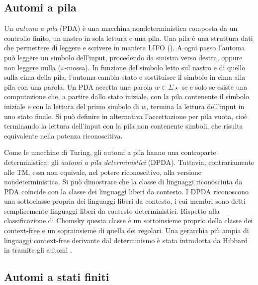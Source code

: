 \subsection{Automi a pila}\label{subs:prel:PDA}
Un \emph{automa a pila} (PDA) è una macchina nondeterministica composta da un controllo finito, un nastro in sola lettura e una pila. Una pila è una struttura dati che permettere di leggere e scrivere in maniera LIFO (). A ogni passo l'automa può leggere un simbolo dell'input, procedendo da sinistra verso destra, oppure non leggere nulla ($\varepsilon$-mossa). In funzione del simbolo letto sul nastro e di quello sulla cima della pila, l'automa cambia stato e sostituisce il simbolo in cima alla pila con una parola. Un PDA accetta una parola $w\in\Sigma\star$ se e solo se esiste una computazione che, a partire dallo stato iniziale, con la pila contenente il simbolo iniziale e con la lettura del primo simbolo di $w$, termina la lettura dell'input in uno stato finale. Si può definire in alternativa l'accettazione per pila vuota, cioè terminando la lettura dell'input con la pila non contenente simboli, che risulta equivalente nella potenza riconoscitiva.

Come le macchine di Turing, gli automi a pila hanno una controparte deterministica: gli \emph{automi a pila deterministici} (DPDA). Tuttavia, contrariamente alle TM, essa non equivale, nel potere riconoscitivo, alla versione nondeterministica. Si può dimostrare che la classe di linguaggi riconosciuta da PDA coincide con la classe dei linguaggi liberi da contesto. I DPDA riconoscono una sottoclasse propria dei linguaggi liberi da contesto, i cui membri sono detti semplicemente linguaggi liberi da contesto deterministici. Rispetto alla classificazione di Chomsky questa classe è un sottoinsieme proprio della classe dei context-free e un soprainsieme di quella dei regolari. Una gerarchia più ampia di linguaggi context-free derivante dal determinismo è stata introdotta da Hibbard in \cite{Hibbard:67:CFdet} tramite gli automi .


\subsection{Automi a stati finiti}\label{subs:prel:NFA}

